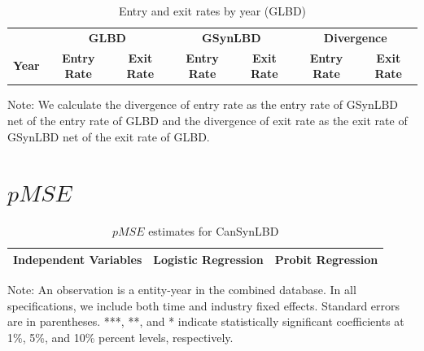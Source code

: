 \begin{table}[H]
  \centering
\begin{threeparttable}
 \caption{Entry and exit rates by year (GLBD)} \label{tab:DE:FirmDynamics} \medskip
\renewcommand{\arraystretch}{1}
\begin{tabular}{l|c c| c c| c c}
\toprule
&\multicolumn{2}{c|}{\textbf{GLBD}} &  \multicolumn{2}{c|}{\textbf{GSynLBD}}&  \multicolumn{2}{c}{\textbf{Divergence}}\\
\textbf{Year}&\textbf{Entry Rate}&\textbf{Exit Rate}&\textbf{Entry Rate}&\textbf{Exit Rate} &\textbf{Entry Rate}&\textbf{Exit Rate}\\
\midrule

   \bottomrule
  \end{tabular} 
\begin{tablenotes}
\small
\item Note: We calculate the divergence of entry rate as the entry rate of GSynLBD net of the entry rate of GLBD and the divergence of exit rate as the exit rate of GSynLBD net of the exit rate of GLBD.
 \end{tablenotes}
 \end{threeparttable}
\end{table}


\section{$pMSE$}
\label{sec:pmse_tables}

\begin{table}[H]
  \centering
\begin{threeparttable}
 \caption{$pMSE$ estimates for CanSynLBD} \label{tab:pMSE_regression} \medskip
\renewcommand{\arraystretch}{1}
\begin{tabular}{l|c c| c c}
\toprule
\textbf{Independent Variables}&\multicolumn{2}{c|}{\textbf{Logistic Regression}} &  \multicolumn{2}{c}{\textbf{Probit Regression}}\\
\midrule

   \bottomrule
  \end{tabular} 
\begin{tablenotes}
\small
\item Note: An observation is a entity-year in the combined database. In all specifications, we include both time and industry fixed effects. Standard errors are in parentheses.  ***, **, and * indicate statistically significant coefficients at 1\%, 5\%, and 10\% percent levels, respectively.
 \end{tablenotes}
 \end{threeparttable}
\end{table}

